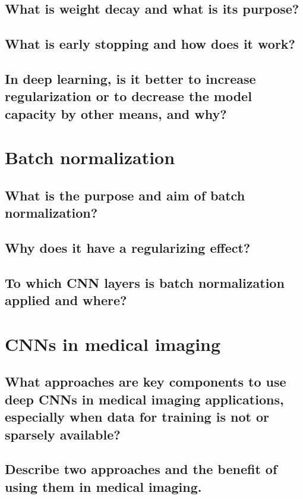 \subsection{What is weight decay and what is its purpose?}
\subsection{What is early stopping and how does it work?}
\subsection{In deep learning, is it better to increase regularization or to decrease the model capacity by other means, and why?}

\section{Batch normalization}
\subsection{What is the purpose and aim of batch normalization?}
\subsection{Why does it have a regularizing effect?}
\subsection{To which CNN layers is batch normalization applied and where?}

\section{CNNs in medical imaging}
\subsection{What approaches are key components to use deep CNNs in medical imaging applications, especially when data for training is not or sparsely available?}
\subsection{Describe two approaches and the benefit of using them in medical imaging.}

\addtocounter{section}{-1}\section{}\label{sec:todo}